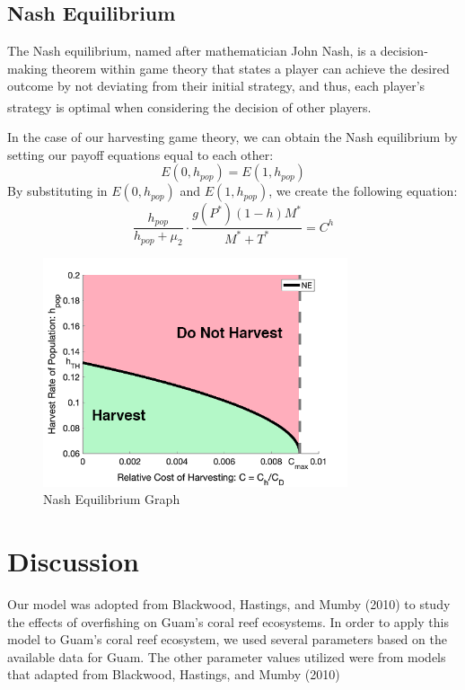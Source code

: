 \documentclass[12pt]{article}
\begin{document}
\subsection{Nash Equilibrium}
The Nash equilibrium, named after mathematician John Nash, is a decision-making theorem within game theory that states a player can achieve the desired outcome by not deviating from their initial strategy, and thus, each player's strategy is optimal when considering the decision of other players\textsuperscript{\cite{nash_definition}}. \par
In the case of our harvesting game theory, we can obtain the Nash equilibrium by setting our payoff equations equal to each other:
\begin{equation*}
    E(0, h_{pop}) = E(1, h_{pop})
\end{equation*}
By substituting in $E(0, h_{pop})$ and $E(1, h_{pop})$, we create the following equation:
\begin{equation*}\label{eq:unsimplified_nash}
    \frac{h_{pop}}{h_{pop} + \mu_{2}} \cdot \frac{g(P^{*})(1-h)M^{*}}{M^{*} + T^{*}} = C^{h}
\end{equation*}

\begin{figure}[H]
    \centering
    \includegraphics[width = 0.8\textwidth] {Latex/Figures/Graphs/nash_1.png}
    \caption{Nash Equilibrium Graph}
    \label{fig:my_label}
\end{figure}

\section{Discussion}
Our model was adopted from Blackwood, Hastings, and Mumby (2010) to study the effects of overfishing on Guam's coral reef ecosystems. In order to apply this model to Guam's coral reef ecosystem, we used several parameters based on the available data for Guam. The other parameter values utilized were from models that adapted from Blackwood, Hastings, and Mumby (2010)
\end{document}
